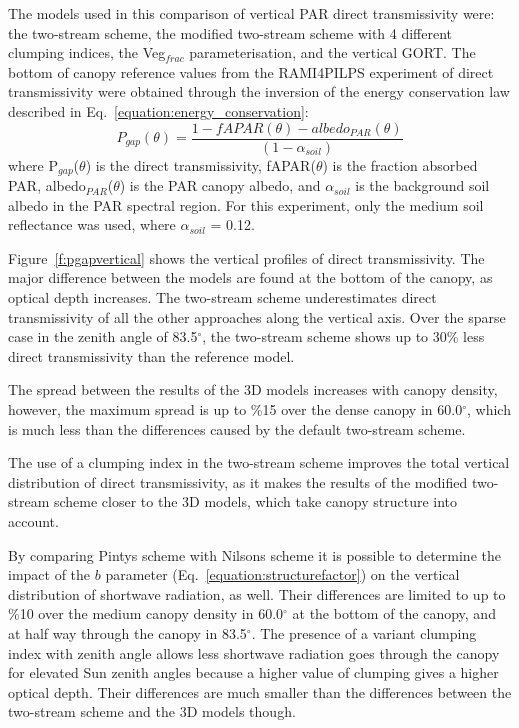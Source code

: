 \documentclass[a4paper,11pt]{report}
\begin{document}
The models used in this comparison of vertical PAR direct transmissivity were: the two-stream scheme, the modified two-stream scheme with 4 different clumping indices, the Veg$_{frac}$ parameterisation, and the vertical GORT. The bottom of canopy reference values from the RAMI4PILPS experiment of direct transmissivity were obtained through the inversion of the energy conservation law described in Eq.~\ref{equation:energy_conservation}:
 \begin{equation}
P_{gap}(\theta) = \frac{1 - fAPAR(\theta) - albedo_{PAR}(\theta)}{(1 - \alpha_{soil})}
\label{equation:energy_conservation}
\end{equation}
\noindent where P$_{gap}$($\theta$) is the direct transmissivity, fAPAR($\theta$) is the fraction absorbed PAR, albedo$_{PAR}$($\theta$) is the PAR canopy albedo, and $\alpha_{soil}$ is the background soil albedo in the PAR spectral region. For this experiment, only the medium soil reflectance was used, where $\alpha_{soil}$ = 0.12.

Figure~\ref{f:pgapvertical} shows the vertical profiles of direct transmissivity. The major difference between the models are found at the bottom of the canopy, as optical depth increases. The two-stream scheme underestimates direct transmissivity of all the other approaches along the vertical axis. Over the sparse case in the zenith angle of 83.5$^{\circ}$, the two-stream scheme shows up to 30\% less direct transmissivity than the reference model.

The spread between the results of the 3D models increases with canopy density, however, the maximum spread is up to \%15 over the dense canopy in 60.0$^{\circ}$, which is much less than the differences caused by the default two-stream scheme.

The use of a clumping index in the two-stream scheme improves the total vertical distribution of direct transmissivity, as it makes the results of the modified two-stream scheme closer to the 3D models, which take canopy structure into account.

By comparing Pinty\textquotesingle s scheme with Nilson\textquotesingle s scheme it is possible to determine the impact of the $b$ parameter (Eq.~\ref{equation:structurefactor}) on the vertical distribution of shortwave radiation, as well. Their differences are limited to up to \%10 over the medium canopy density in 60.0$^{\circ}$ at the bottom of the canopy, and at half way through the canopy in 83.5$^{\circ}$. The presence of a variant clumping index with zenith angle allows less shortwave radiation goes through the canopy for elevated Sun zenith angles because a higher value of clumping gives a higher optical depth. Their differences are much smaller than the differences between the two-stream scheme and the 3D models though.
\end{document}

